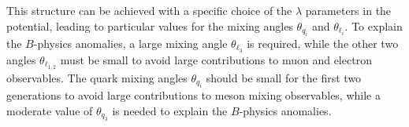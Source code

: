 This structure can be achieved with a specific choice of the $\lambda$ parameters in the potential, leading to particular values for the mixing angles $\theta_{q_i}$ and $\theta_{\ell_i}$. To explain the $B$-physics anomalies, a large mixing angle $\theta_{\ell_3}$ is required, while the other two angles $\theta_{\ell_{1,2}}$ must be small to avoid large contributions to muon and electron observables. The quark mixing angles $\theta_{q_i}$ should be small for the first two generations to avoid large contributions to meson mixing observables, while a moderate value of $\theta_{q_3}$ is needed to explain the $B$-physics anomalies.